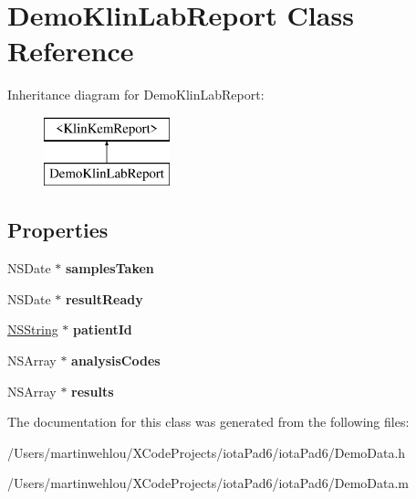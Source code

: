 \hypertarget{interface_demo_klin_lab_report}{
\section{DemoKlinLabReport Class Reference}
\label{interface_demo_klin_lab_report}
}
Inheritance diagram for DemoKlinLabReport:\begin{figure}[H]
\begin{center}
\leavevmode
\includegraphics[height=2.000000cm]{interface_demo_klin_lab_report}
\end{center}
\end{figure}
\subsection*{Properties}
\begin{DoxyCompactItemize}
\item 
\hypertarget{interface_demo_klin_lab_report_a9bd0f9754a76203639d9273183af854b}{
NSDate $\ast$ {\bfseries samplesTaken}}
\label{interface_demo_klin_lab_report_a9bd0f9754a76203639d9273183af854b}

\item 
\hypertarget{interface_demo_klin_lab_report_a2ad18b7fdc0a3ca3639d264830cf0194}{
NSDate $\ast$ {\bfseries resultReady}}
\label{interface_demo_klin_lab_report_a2ad18b7fdc0a3ca3639d264830cf0194}

\item 
\hypertarget{interface_demo_klin_lab_report_a4ec43fa6b57fad5a6479ab7aada653b3}{
\hyperlink{class_n_s_string}{NSString} $\ast$ {\bfseries patientId}}
\label{interface_demo_klin_lab_report_a4ec43fa6b57fad5a6479ab7aada653b3}

\item 
\hypertarget{interface_demo_klin_lab_report_a2648b72797e2069d48028d04f4f0c193}{
NSArray $\ast$ {\bfseries analysisCodes}}
\label{interface_demo_klin_lab_report_a2648b72797e2069d48028d04f4f0c193}

\item 
\hypertarget{interface_demo_klin_lab_report_a79146f79b359111f76f9740a2f4ee6b8}{
NSArray $\ast$ {\bfseries results}}
\label{interface_demo_klin_lab_report_a79146f79b359111f76f9740a2f4ee6b8}

\end{DoxyCompactItemize}


The documentation for this class was generated from the following files:\begin{DoxyCompactItemize}
\item 
/Users/martinwehlou/XCodeProjects/iotaPad6/iotaPad6/DemoData.h\item 
/Users/martinwehlou/XCodeProjects/iotaPad6/iotaPad6/DemoData.m\end{DoxyCompactItemize}
